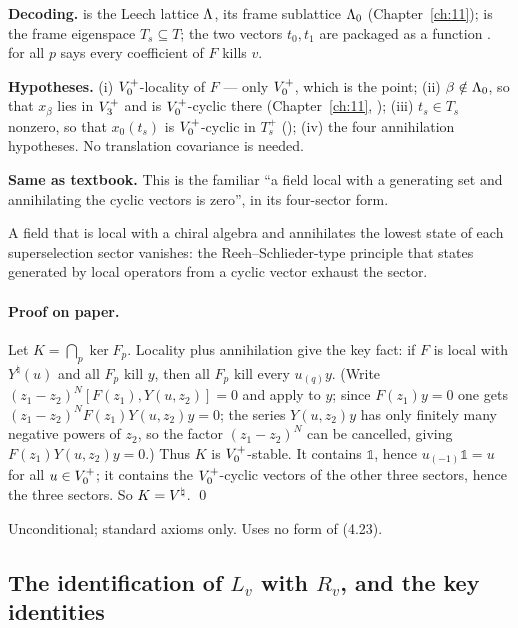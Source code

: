 \begin{dictionary}
\textbf{Decoding.}   is the Leech lattice ${\Lambda}$,  its
frame sublattice ${\Lambda}_0$ (Chapter~\ref{ch:11});  is the frame eigenspace
$T_s\subseteq T$; the two vectors $t_0,t_1$ are packaged as a function .
 for all $p$ says every coefficient of $F$ kills $v$.

\textbf{Hypotheses.}  (i) $V_0^{+}$-locality of $F$ — only $V_0^{+}$, which is the point; (ii)
$\beta\notin{\Lambda}_0$, so that $x_\beta$ lies in $V_3^{+}$ and is $V_0^{+}$-cyclic there (Chapter~\ref{ch:11},
); (iii) $t_s\in T_s$ nonzero, so that $x_0(t_s)$ is $V_0^{+}$-cyclic in $T_s^+$
(); (iv) the four annihilation hypotheses.  No translation covariance is needed.

\textbf{Same as textbook.}  This is the familiar ``a field local with a generating set and
annihilating the cyclic vectors is zero'', in its four-sector form.
\end{dictionary}
\begin{physics}
A field that is local with a chiral algebra and annihilates the lowest state of each superselection sector vanishes: the Reeh--Schlieder-type principle that states generated by local operators from a cyclic vector exhaust the sector.
\end{physics}


\paragraph{Proof on paper.}  Let $K=\bigcap_p\ker F_p$.  Locality plus annihilation give the
key fact: if $F$ is local with $Y^\natural(u)$ and all $F_p$ kill $y$, then all $F_p$ kill every
$u_{(q)}y$.  (Write $(z_1-z_2)^N[F(z_1),Y(u,z_2)]=0$ and apply to $y$; since $F(z_1)y=0$ one gets
$(z_1-z_2)^NF(z_1)Y(u,z_2)y=0$; the series $Y(u,z_2)y$ has only finitely many negative powers of
$z_2$, so the factor $(z_1-z_2)^N$ can be cancelled, giving $F(z_1)Y(u,z_2)y=0$.)  Thus $K$ is
$V_0^{+}$-stable.  It contains $\mathbb 1$, hence $u_{(-1)}\mathbb 1=u$ for all $u\in V_0^{+}$; it
contains the $V_0^{+}$-cyclic vectors of the other three sectors, hence the three sectors.  So
$K={V^{\natural}}$. \qed

\begin{status}Unconditional; standard axioms only.  Uses no form of (4.23).\end{status}

\subsection{\texorpdfstring{The identification of $L_v$ with $R_v$, and the key identities}{The identification of L_v with R_v, and the key identities}}

